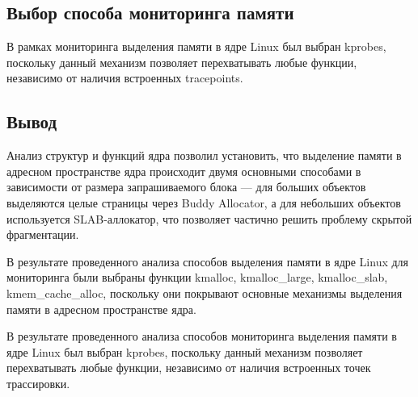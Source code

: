 

\subsection*{Выбор способа мониторинга памяти}

В рамках мониторинга выделения памяти в ядре Linux был выбран kprobes, поскольку данный механизм позволяет перехватывать любые функции, независимо от наличия встроенных tracepoints.

\subsection*{Вывод}

Анализ структур и функций ядра позволил установить, что выделение памяти в адресном пространстве ядра происходит двумя основными способами в зависимости от размера запрашиваемого блока --- для больших объектов выделяются целые страницы через Buddy Allocator, а для небольших объектов используется SLAB-аллокатор, что позволяет частично решить проблему скрытой фрагментации.

В результате проведенного анализа способов выделения памяти в ядре Linux для мониторинга были выбраны функции kmalloc, kmalloc\_large, kmalloc\_slab, kmem\_cache\_alloc, поскольку они покрывают основные механизмы выделения памяти в адресном пространстве ядра.

В результате проведенного анализа способов мониторинга выделения памяти в ядре Linux был выбран kprobes, поскольку данный механизм позволяет перехватывать любые функции, независимо от наличия встроенных точек трассировки.

